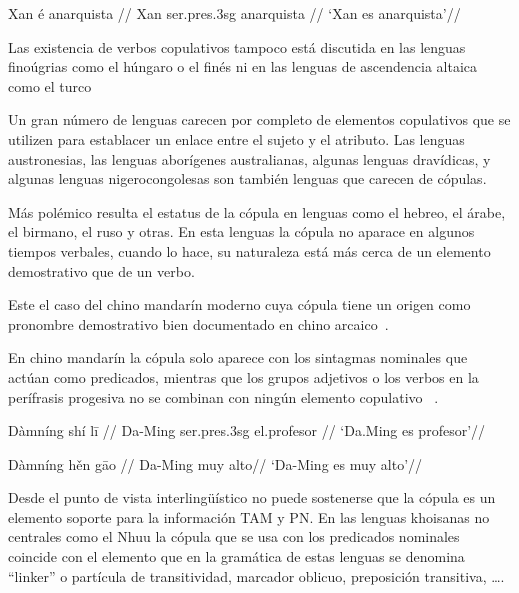 \ex[glspace=!1em,everygla={},everyglb={},aboveglbskip=-.2ex]
\begingl
\gla Xan é anarquista //
\glb Xan ser.{\sc pres}.{\sc 3sg} anarquista  //
\glft ‘Xan es anarquista’//
\endgl
\xe


Las existencia de verbos copulativos tampoco está discutida en las lenguas finoúgrias como el húngaro o el finés ni en las lenguas de ascendencia altaica como el turco


Un gran número de lenguas carecen por completo de elementos copulativos que se utilizen para establacer un enlace entre el sujeto y el atributo. Las lenguas austronesias, las lenguas aborígenes australianas, algunas lenguas dravídicas, y algunas lenguas nigerocongolesas son también lenguas que carecen de cópulas.

Más polémico resulta el estatus de la cópula en lenguas como el hebreo, el árabe, el birmano, el ruso y otras. En esta lenguas la cópula no aparace en algunos tiempos verbales, cuando lo hace, su naturaleza está más cerca de un elemento demostrativo que de un verbo. 


Este el caso del chino mandarín moderno cuya cópula tiene un origen como pronombre demostrativo bien documentado en chino arcaico~\parencites{Li1977Mechanismdevelopmentcopula}{Lohndal2009Copula-cycle}{Gelderen2011The-Pronominal}.

 En chino mandarín la cópula solo aparece con los sintagmas nominales que actúan como predicados, mientras que los grupos adjetivos o los verbos en la perífrasis progesiva no se combinan con ningún elemento copulativo ~\parencites{Pustet2003Copulas-univer}.
 
 
 \ex[glspace=!1em,everygla={},everyglb={},aboveglbskip=-.2ex]
\begingl
\gla Dàmníng shí l\={i} //
\glb Da-Ming ser.{\sc pres}.{\sc 3sg} el.profesor  //
\glft ‘Da.Ming es profesor’//
\endgl
\xe
 
\ex[glspace=!1em,everygla={},everyglb={},aboveglbskip=-.2ex]
\begingl
\gla Dàmníng h\v{e}n g\={a}o //
\glb Da-Ming {} muy alto//
\glft ‘Da-Ming es muy alto’//
\endgl
\xe
 
  



Desde el punto de vista interlingüístico no puede sostenerse que la cópula es un elemento soporte para la información TAM y PN. En las lenguas khoisanas no centrales como el Nhuu la cópula que se usa con los predicados nominales coincide con el elemento que en la gramática de estas lenguas  se denomina \enquote{linker} o partícula de transitividad, marcador oblicuo, preposición transitiva, \ldots.

